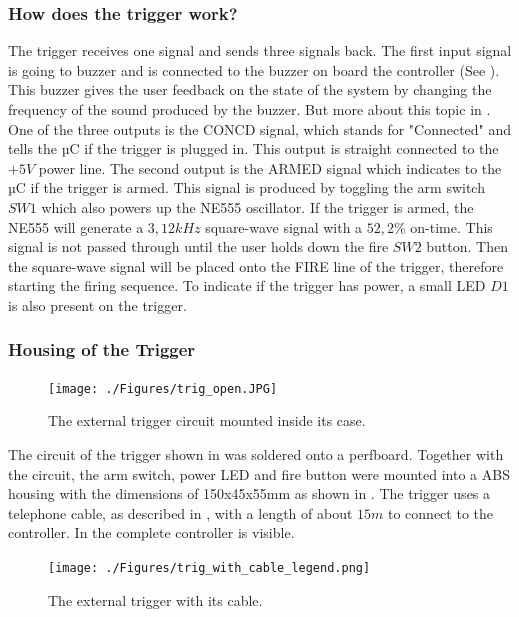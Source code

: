 \pagebreak

\subsubsection{How does the trigger work?}
The trigger receives one signal and sends three signals back. The first 
input signal is going to buzzer and is connected to the buzzer on board the controller (See ). This buzzer gives the user feedback on the state of the system by changing the frequency of the sound produced by the buzzer. But more about this topic in . One of the three outputs is the CONCD signal, which stands for "Connected" and tells the µC if the trigger is plugged in. This output is straight connected to the $+5V$ power line.
The second output is the ARMED signal which indicates to the µC if the trigger is armed. This signal is produced by toggling the arm switch $SW1$ which also powers up the NE555 oscillator. If the trigger is armed, the NE555 will generate a $3,12kHz$ square-wave signal with a $52,2\%$ on-time. This signal is not passed through until the user holds down the fire $SW2$ button. Then the square-wave signal will be placed onto the FIRE line of the trigger, therefore starting the firing sequence. To indicate if the trigger has power, a small LED $D1$ is also present on the trigger.

\subsubsection{Housing of the Trigger}

\begin{figure}[!ht]
    \centering
    \texttt{[image: ./Figures/trig\_open.JPG]}
    \caption{The external trigger circuit mounted inside its case.}
    \label{fig:trig_open}     
\end{figure}

\noindent The circuit of the trigger shown in  was soldered onto a perfboard. Together with the circuit, the arm switch, power LED and fire button were mounted into a ABS housing with the dimensions of 150x45x55mm as shown in . The trigger uses a telephone cable, as described in , with a length of about $15m$ to connect to the controller. In  the complete controller is visible.

\begin{figure}[!ht]
    \centering
    \texttt{[image: ./Figures/trig\_with\_cable\_legend.png]}
    \caption{The external trigger with its cable.}
    \label{fig:trig_with_cable_legend}     
\end{figure}

